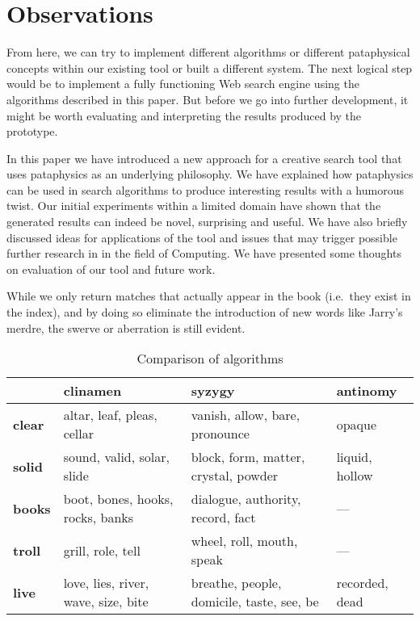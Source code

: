 
\chapter{Observations}
\label{ch:observations}

\vspace{1cm}
\startcontents[chapters]
\minicontents
\vspace{1cm}

From here, we can try to implement different algorithms or different pataphysical concepts within our existing tool or built a different system. The next logical step would be to implement a fully functioning Web search engine using the algorithms described in this paper. But before we go into further development, it might be worth evaluating and interpreting the results produced by the prototype.

In this paper we have introduced a new approach for a creative search tool that uses pataphysics as an underlying philosophy.  We have explained how pataphysics can be used in search algorithms to produce interesting results with a humorous twist. Our initial experiments within a limited domain have shown that the generated results can indeed be novel, surprising and useful. We have also briefly discussed ideas for applications of the tool and issues that may trigger possible further research in in the field of Computing. We have presented some thoughts on evaluation of our tool and future work.

While we only return matches that actually appear in the book (i.e.\ they exist in the index), and by doing so eliminate the introduction of new words like Jarry's merdre, the swerve or aberration is still evident.

\begin{table}[htb]
  \begin{tabu}{X[1,L]|X[3,L]X[3,L]X[2,L]}
  \toprule
  &
  \textbf{clinamen}
  &
  \textbf{syzygy}
  &
  \textbf{antinomy}
  \\ \midrule
  \textbf{clear}
  &
  altar, leaf, pleas, cellar
  &
  vanish, allow, bare, pronounce
  &
  opaque
  \\ \midrule
  \textbf{solid}
  &
  sound, valid, solar, slide
  &
  block, form, matter, crystal, powder
  &
  liquid, hollow
  \\ \midrule
  \textbf{books}
  &
  boot, bones, hooks, rocks, banks
  &
  dialogue, authority, record, fact
  &
  ---
  \\ \midrule
  \textbf{troll}
  &
  grill, role, tell
  &
  wheel, roll, mouth, speak
  &
  ---
  \\ \midrule
  \textbf{live}
  &
  love, lies, river, wave, size, bite
  &
  breathe, people, domicile, taste, see, be
  &
  recorded, dead
  \\ \bottomrule
  \end{tabu}
\caption[Comparison of algorithms]{Comparison of algorithms}
\label{algorithmscomp}
\end{table}



